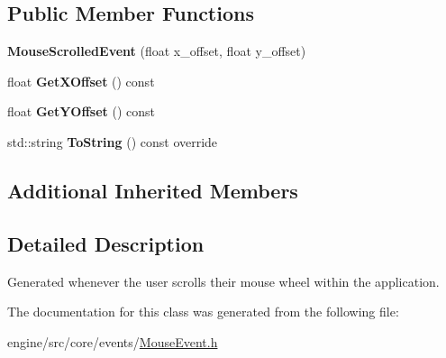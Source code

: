 \subsection*{Public Member Functions}
\begin{DoxyCompactItemize}
\item 
\mbox{\label{classengine_1_1events_1_1MouseScrolledEvent_ad118d6e0e1b9e17e8853139af451f972}} 
{\bfseries Mouse\+Scrolled\+Event} (float x\+\_\+offset, float y\+\_\+offset)
\item 
\mbox{\label{classengine_1_1events_1_1MouseScrolledEvent_a6811c762e35b9aa99efb92629f624d37}} 
float {\bfseries Get\+X\+Offset} () const
\item 
\mbox{\label{classengine_1_1events_1_1MouseScrolledEvent_ac8497ef915ec94c1bca1646550ac0f45}} 
float {\bfseries Get\+Y\+Offset} () const
\item 
\mbox{\label{classengine_1_1events_1_1MouseScrolledEvent_aac2386bd24310ea41ce995134614aba9}} 
std\+::string {\bfseries To\+String} () const override
\end{DoxyCompactItemize}
\subsection*{Additional Inherited Members}


\subsection{Detailed Description}
Generated whenever the user scrolls their mouse wheel within the application. 

The documentation for this class was generated from the following file\+:\begin{DoxyCompactItemize}
\item 
engine/src/core/events/\hyperlink{MouseEvent_8h}{Mouse\+Event.\+h}\end{DoxyCompactItemize}
